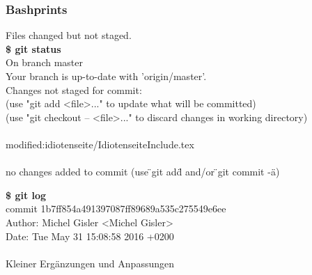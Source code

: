 \subsubsection{Bashprints}
\begin{multicols}{2}
	\begin{minipage}[l]{.40\textwidth}
		Files changed but not staged.\\    
		\textbf{\$ git status}\\
		On branch master\\
		Your branch is up-to-date with 'origin/master'.\\
		Changes not staged for commit:\\
		\quad (use "git add <file>..." to update what will be committed)\\
		\quad (use "git checkout -- <file>..." to discard changes in working directory)\\
		\\
		\qquad modified:\quad idiotenseite/IdiotenseiteInclude.tex\\
		\\
		no changes added to commit \newline (use \"{}git add\"{} and/or \"{}git commit -a\"{})\\
	\end{minipage}
	
	\begin{minipage}[r]{.40\textwidth}
		\textbf{\$ git log}\\
		commit 1b7ff854a491397087ff89689a535c275549e6ee\\
		Author: \quad Michel Gisler <Michel Gisler>\\
		Date:  \quad  Tue May 31 15:08:58 2016 +0200\\
		\\  
		\qquad Kleiner Ergänzungen und Anpassungen\\
	\end{minipage}
\end{multicols}
\clearpage
\pagebreak

\thispagestyle{empty}
\enlargethispage{3\baselineskip}
